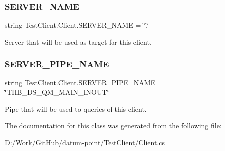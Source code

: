 \subsubsection{\texorpdfstring{S\+E\+R\+V\+E\+R\+\_\+\+N\+A\+ME}{SERVER\_NAME}}
{\footnotesize\ttfamily string Test\+Client.\+Client.\+S\+E\+R\+V\+E\+R\+\_\+\+N\+A\+ME = \char`\"{}.\char`\"{}\hspace{0.3cm}{\ttfamily [static]}}



Server that will be used as target for this client. 

\mbox{\label{class_test_client_1_1_client_a58c70d565592caa15b99d9b145a133ea}} 
\subsubsection{\texorpdfstring{S\+E\+R\+V\+E\+R\+\_\+\+P\+I\+P\+E\+\_\+\+N\+A\+ME}{SERVER\_PIPE\_NAME}}
{\footnotesize\ttfamily string Test\+Client.\+Client.\+S\+E\+R\+V\+E\+R\+\_\+\+P\+I\+P\+E\+\_\+\+N\+A\+ME = \char`\"{}T\+H\+B\+\_\+\+D\+S\+\_\+\+Q\+M\+\_\+\+M\+A\+I\+N\+\_\+\+I\+N\+O\+UT\char`\"{}\hspace{0.3cm}{\ttfamily [static]}}



Pipe that will be used to queries of this client. 



The documentation for this class was generated from the following file\+:\begin{DoxyCompactItemize}
\item 
D\+:/\+Work/\+Git\+Hub/datum-\/point/\+Test\+Client/Client.\+cs\end{DoxyCompactItemize}
